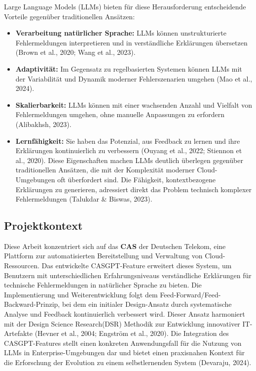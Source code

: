 \documentclass[
  a4paper,
  12pt,
  oneside,
  open=any,
  BCOR=12mm,
  DIV=14,
  parskip=half*,
  headsepline,
  footsepline,
  pointlessnumbers,
  liststotoc,
  numbers=noenddot,
  listof=totoc]{scrartcl}
\begin{document}
Large Language Models (LLMs) bieten für diese Herausforderung
entscheidende Vorteile gegenüber traditionellen Ansätzen:

\begin{itemize}
\item
  \textbf{Verarbeitung natürlicher Sprache:} LLMs können unstrukturierte
  Fehlermeldungen interpretieren und in verständliche Erklärungen
  übersetzen (Brown et al., 2020; Wang et al., 2023).
\item
  \textbf{Adaptivität:} Im Gegensatz zu regelbasierten Systemen können
  LLMs mit der Variabilität und Dynamik moderner Fehlerszenarien umgehen
  (Mao et al., 2024).
\item
  \textbf{Skalierbarkeit:} LLMs können mit einer wachsenden Anzahl und
  Vielfalt von Fehlermeldungen umgehen, ohne manuelle Anpassungen zu
  erfordern (Alibakhsh, 2023).
\item
  \textbf{Lernfähigkeit:} Sie haben das Potenzial, aus Feedback zu
  lernen und ihre Erklärungen kontinuierlich zu verbessern (Ouyang et
  al., 2022; Stiennon et al., 2020). Diese Eigenschaften machen LLMs
  deutlich überlegen gegenüber traditionellen Ansätzen, die mit der
  Komplexität moderner Cloud-Umgebungen oft überfordert sind. Die
  Fähigkeit, kontextbezogene Erklärungen zu generieren, adressiert
  direkt das Problem technisch komplexer Fehlermeldungen (Talukdar \&
  Biswas, 2023).
\end{itemize}

\subsection{Projektkontext}\label{projektkontext}

Diese Arbeit konzentriert sich auf das \textbf{CAS} der Deutschen
Telekom, eine Plattform zur automatisierten Bereitstellung und
Verwaltung von Cloud-Ressourcen. Das entwickelte CASGPT-Feature
erweitert dieses System, um Benutzern mit unterschiedlichen
Erfahrungsniveaus verständliche Erklärungen für technische
Fehlermeldungen in natürlicher Sprache zu bieten. Die Implementierung
und Weiterentwicklung folgt dem Feed-Forward/Feed-Backward-Prinzip, bei
dem ein initialer Design-Ansatz durch systematische Analyse und Feedback
kontinuierlich verbessert wird. Dieser Ansatz harmoniert mit der Design
Science Research(DSR) Methodik zur Entwicklung innovativer IT-Artefakte
(Hevner et al., 2004; Engström et al., 2020). Die Integration des
CASGPT-Features stellt einen konkreten Anwendungsfall für die Nutzung
von LLMs in Enterprise-Umgebungen dar und bietet einen praxisnahen
Kontext für die Erforschung der Evolution zu einem selbstlernenden
System (Devaraju, 2024).
\end{document}
